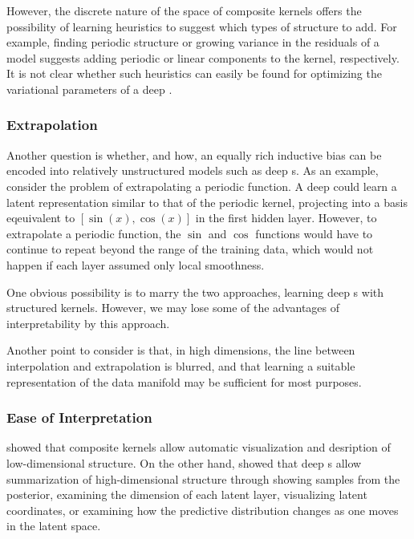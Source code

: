 However, the discrete nature of the space of composite kernels offers the possibility of learning heuristics to suggest which types of structure to add.
For example, finding periodic structure or growing variance in the residuals of a model suggests adding periodic or linear components to the kernel, respectively.
It is not clear whether such heuristics can easily be found for optimizing the variational parameters of a deep \gp{}.

\subsubsection{Extrapolation}
Another question is whether, and how, an equally rich inductive bias can be encoded into relatively unstructured models such as deep \gp{}s.
As an example, consider the problem of extrapolating a periodic function.
A deep \gp{} could learn a latent representation similar to that of the periodic kernel, projecting into a basis eqeuivalent to $[\sin(x), \cos(x)]$ in the first hidden layer.
However, to extrapolate a periodic function, the $\sin$ and $\cos$ functions would have to continue to repeat beyond the range of the training data, which would not happen if each layer assumed only local smoothness.

One obvious possibility is to marry the two approaches, learning deep \gp{}s with structured kernels.
However, we may lose some of the advantages of interpretability by this approach.

Another point to consider is that, in high dimensions, the line between interpolation and extrapolation is blurred, and that learning a suitable representation of the data manifold may be sufficient for most purposes.

\subsubsection{Ease of Interpretation}
 showed that composite kernels allow automatic visualization and desription of low-dimensional structure.
On the other hand, \citet{damianou2012deep} showed that deep \gplvm{}s allow summarization of high-dimensional structure through showing samples from the posterior, examining the dimension of each latent layer, visualizing latent coordinates, or examining how the predictive distribution changes as one moves in the latent space.








